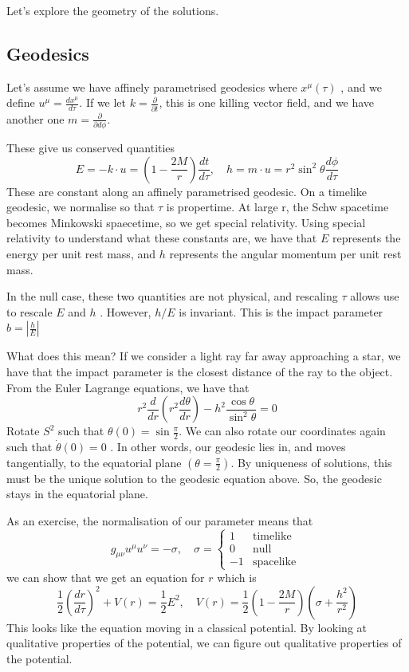\documentclass[11pt, oneside]{article}   	%
\theoremstyle{slanted}
\begin{document}
Let's explore the geometry of 
the solutions. 

\subsection{Geodesics}
Let's assume we have 
affinely parametrised geodesics where 
$ x ^ \mu \left( \tau  \right)  $ , 
and we define $ u ^ \mu  = \frac{ dx ^ \mu }{ d \tau } $. 
If we let $ k  = \frac{\partial  }{\partial  t }  $, 
this is one killing vector field, 
and we have another one $ m   = \frac{\partial  }{\partial  d \phi }  $. 

These give us conserved quantities 
\[
E =  - k \cdot  u  = \left( 1 - \frac{2M}{ r }  \right)  \frac{dt}{d \tau }, 
\quad h = m \cdot  u  =  r^ 2 \sin ^ 2 \theta \frac{ d \phi }{ d \tau } 
\]  These are constant along an affinely 
parametrised geodesic. 
On a timelike geodesic,  
we normalise so that $ \tau $ is propertime. 
At large r, the Schw spacetime becomes 
Minkowski spaecetime, so we get special relativity. 
Using special relativity to understand what these constants are, 
we have that $ E $ represents the energy per unit rest mass, 
and $ h $ represents the angular momentum per unit rest mass. 

In the null case, these two quantities are not physical, 
and rescaling $ \tau $ allows use to rescale $ E $ and $ h$ . 
However, $ h / E $ is invariant. 
This is the impact parameter $ b  = |\frac{ h  }{E} | $  

What does this mean? 
If we consider a light ray far away approaching a 
star, we have that the impact parameter 
is the closest distance of the ray to 
the object. 
From the Euler Lagrange equations, 
we have that 
\[
r ^ 2 \frac{ d }{ dr } \left( r ^ 2 \frac{d \theta }{ dr }  \right)  
 - h ^ 2 \frac{ \cos \theta }{ \sin ^ 2 \theta }  =0 
\]  Rotate $  S^ 2 $ such that $ \theta \left( 0  \right)   = \sin \frac{\pi}{2 }$. 
We can also rotate our coordinates again such that $ \dot{ \theta } \left( 0  \right)   = 0  $ . In other 
words, our geodesic lies in, and moves 
tangentially, to the equatorial plane $ \left( \theta  = \frac{\pi }{ 2 }  \right)  $. 
By uniqueness of solutions, this must 
be the unique solution 
to the geodesic equation above. 
So, the geodesic stays in the equatorial plane. 

As an exercise, the normalisation 
of our parameter means that 
\[
g _{ \mu \nu } u ^ \mu u ^ \nu  =  - \sigma , \quad 
\sigma = \begin{cases}
  1 & \text{timelike } \\
  0 & \text{null } \\
   -1 & \text{spacelike } 
\end{cases}
\] we can show that 
we get an equation for $ r $ 
which is 
\[
 \frac{1}{2 } \left( \frac{dr}{d \tau }  \right)  ^ 2 + V ( r ) 
 = \frac{1}{2 } E ^ 2 , \quad V ( r )  = \frac{1}{2 } 
 \left(  1 - \frac{2M}{r }  \right)  \left( \sigma + \frac{h ^ 2 }{ r ^ 2 } \right) 
\] This looks like the equation 
moving in a classical potential. 
By looking at qualitative properties 
of the potential, we 
can figure out qualitative 
properties of the potential. 
\end{document}
